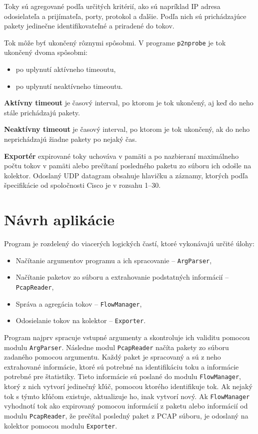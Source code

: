 \documentclass[a4paper, 12pt]{article}
\begin{document}
Toky sú agregované podľa určitých kritérií, ako sú napríklad IP adresa odosielateľa a prijímateľa, porty, protokol a ďalšie. Podľa nich sú prichádzajúce pakety jedinečne identifikovateľné a priradené do tokov.

Tok môže byť ukončený rôznymi spôsobmi. V programe \texttt{p2nprobe} je tok ukončený dvoma spôsobmi:
\begin{itemize}
    \item po uplynutí aktívneho timeoutu,
    \item po uplynutí neaktívneho timeoutu.
\end{itemize}

\textbf{Aktívny timeout} je časový interval, po ktorom je tok ukončený, aj keď do neho stále prichádzajú pakety.

\textbf{Neaktívny timeout} je časový interval, po ktorom je tok ukončený, ak do neho neprichádzajú žiadne pakety po nejaký čas.

\textbf{Exportér} expirované toky uchováva v pamäti a po nazbieraní maximálneho počtu tokov v pamäti alebo prečítaní posledného paketu zo súboru ich odošle na kolektor. Odoslaný UDP datagram obsahuje hlavičku a záznamy, ktorých podľa špecifikácie od spoločnosti Cisco je v rozsahu 1--30.

\section{Návrh aplikácie}

Program je rozdelený do viacerých logických častí, ktoré vykonávajú určité úlohy:
\begin{itemize}
    \item Načítanie argumentov programu a ich spracovanie -- \texttt{ArgParser},
    \item Načítanie paketov zo súboru a extrahovanie podstatných informácií -- \texttt{PcapReader},
    \item Správa a agregácia tokov -- \texttt{FlowManager},
    \item Odosielanie tokov na kolektor -- \texttt{Exporter}.
\end{itemize}

Program najprv spracuje vstupné argumenty a skontroluje ich validitu pomocou modulu \texttt{ArgParser}. Následne modul \texttt{PcapReader} načíta pakety zo súboru zadaného pomocou argumentu. Každý paket je spracovaný a sú z neho extrahované informácie, ktoré sú potrebné na identifikáciu toku a informácie potrebné pre štatistiky. Tieto informácie sú poslané do modulu \texttt{FlowManager}, ktorý z nich vytvorí jedinečný kľúč, pomocou ktorého identifikuje tok. Ak nejaký tok s týmto kľúčom existuje, aktualizuje ho, inak vytvorí nový. Ak \texttt{FlowManager} vyhodnotí tok ako expirovaný pomocou informácií z paketu alebo informácií od modulu \texttt{PcapReader}, že prečítal posledný paket z PCAP súboru, je odoslaný na kolektor pomocou modulu \texttt{Exporter}.
\end{document}

